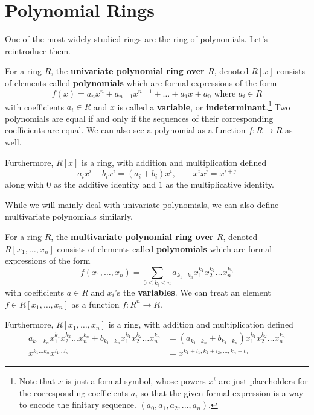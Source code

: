 \section{Polynomial Rings} 

  One of the most widely studied rings are the ring of polynomials. Let's reintroduce them. 

  \begin{definition}
    For a ring $R$, the \textbf{univariate polynomial ring over $R$}, denoted $R[x]$ consists of elements called \textbf{polynomials} which are formal expressions of the form 
    \begin{equation}
      f(x) = a_nx^n + a_{n-1}x^{n-1} + \dots + a_1x + a_0 \text{ where } a_i \in R
    \end{equation}
    with coefficients $a_i \in R$ and $x$ is called a \textbf{variable}, or \textbf{indeterminant}.\footnote{Note that $x$ is just a formal symbol, whose powers $x^i$ are just placeholders for the corresponding coefficients $a_i$ so that the given formal expression is a way to encode the finitary sequence. $(a_0, a_1, a_2, ..., a_n)$.} Two polynomials are equal if and only if the sequences of their corresponding coefficients are equal. We can also see a polynomial as a function $f: R \rightarrow R$ as well. 

    Furthermore, $R[x]$ is a ring, with addition and multiplication defined
    \begin{equation}
      a_i x^i + b_i x^i = (a_i + b_i) x^i, \qquad x^ix^j = x^{i+j}
    \end{equation}
    along with $0$ as the additive identity and $1$ as the multiplicative identity.   
  \end{definition}

  While we will mainly deal with univariate polynomials, we can also define multivariate polynomials similarly. 

  \begin{definition} 
    For a ring $R$, the \textbf{multivariate polynomial ring over $R$}, denoted $R[x_1, \ldots, x_n]$ consists of elements called \textbf{polynomials} which are formal expressions of the form 
    \begin{equation}
      f(x_1, \ldots, x_n) = \sum_{0 \leq k_i \leq n} a_{k_1 \ldots k_n} x_1^{k_1} x_2^{k_2} \ldots x_n^{k_n}
    \end{equation}
    with coefficients $a \in R$ and $x_i$'s the \textbf{variables}. We can treat an element $f \in R[x_1, \ldots, x_n]$ as a function $f: R^n \rightarrow R$.  

    Furthermore, $R[x_1, \ldots, x_n]$ is a ring, with addition and multiplication defined 
    \begin{align}
      a_{k_1 \ldots k_n} x_1^{k_1} x_2^{k_2} \ldots x_n^{k_n} + b_{k_1 \ldots k_n} x_1^{k_1} x_2^{k_2} \ldots x_n^{k_n} & = (a_{k_1 \ldots k_n} + b_{k_1 \ldots k_n}) x_1^{k_1} x_2^{k_2} \ldots x_n^{k_n} \\
      x^{k_1 \ldots k_n} x^{l_1 \ldots l_n} & = x^{k_1 + l_1, k_2 + l_2, \ldots, k_n + l_n}
    \end{align}
  \end{definition}

